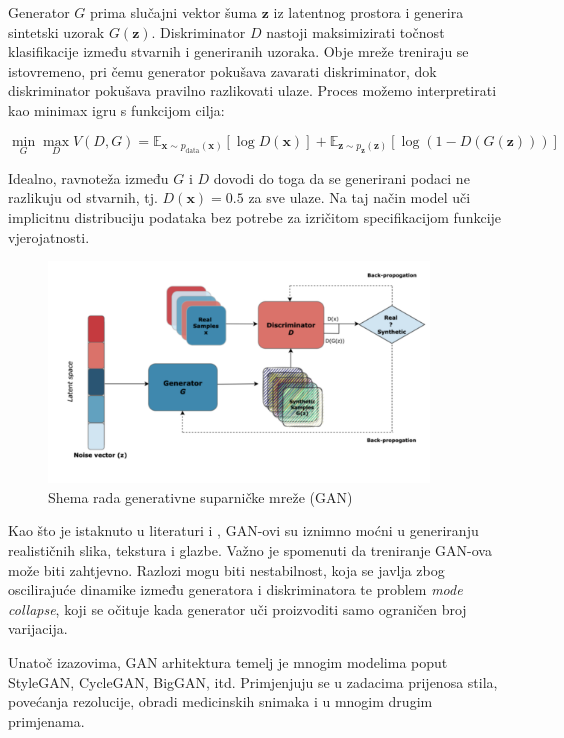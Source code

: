\documentclass[times, utf8, seminar, numeric]{fer}
\begin{document}
		Generator $G$ prima slučajni vektor šuma $\bm{z}$ iz latentnog prostora i generira sintetski uzorak $G(\bm{z})$. Diskriminator $D$ nastoji maksimizirati točnost klasifikacije između stvarnih i generiranih uzoraka. Obje mreže treniraju se istovremeno, pri čemu generator pokušava zavarati diskriminator, dok diskriminator pokušava pravilno razlikovati ulaze. Proces možemo interpretirati kao minimax igru s funkcijom cilja:
		
		\[
		\min_G \max_D V(D, G) = \mathbb{E}_{\bm{x} \sim p_{\text{data}}(\bm{x})}[\log D(\bm{x})] + \mathbb{E}_{\bm{z} \sim p_{\bm{z}}(\bm{z})}[\log(1 - D(G(\bm{z})))]
		\]
		
		Idealno, ravnoteža između $G$ i $D$ dovodi do toga da se generirani podaci ne razlikuju od stvarnih, tj. $D(\bm{x}) = 0.5$ za sve ulaze. Na taj način model uči implicitnu distribuciju podataka bez potrebe za izričitom specifikacijom funkcije vjerojatnosti.
		
		\begin{figure}[H]
			\centering
			\includegraphics[width=0.9\textwidth]{images/apply/superres/GAN_shema.png}
			\caption{Shema rada generativne suparničke mreže (GAN) \cite{kinezi}}
			\label{fig:gan_arch}
		\end{figure}
		
		Kao što je istaknuto u literaturi  \cite{goodfellow2016deep} i \cite{foster2019generative}, GAN-ovi su iznimno moćni u generiranju realističnih slika, tekstura i glazbe. Važno je spomenuti da treniranje GAN-ova može biti zahtjevno. Razlozi mogu biti nestabilnost, koja se javlja zbog oscilirajuće dinamike između generatora i diskriminatora te problem \textit{mode collapse}, koji se očituje kada generator uči proizvoditi samo ograničen broj varijacija.
		
		Unatoč izazovima, GAN arhitektura temelj je mnogim modelima poput StyleGAN, CycleGAN, BigGAN, itd. Primjenjuju se u zadacima prijenosa stila, povećanja rezolucije, obradi medicinskih snimaka i u mnogim drugim primjenama.
		
\end{document}
